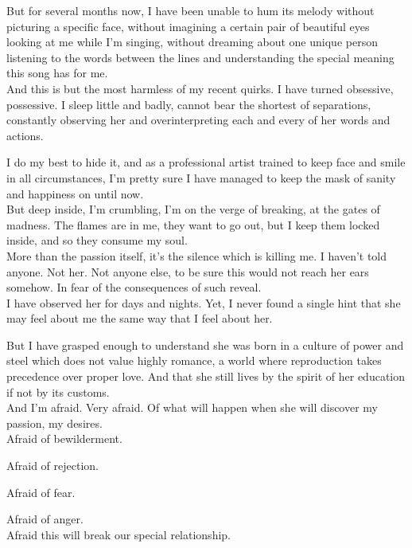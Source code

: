 \documentclass{report}
\begin{document}
But for several months now, I have been unable to hum its melody without picturing a specific face, without imagining a certain pair of beautiful eyes looking at me while I'm singing, without dreaming about one unique person listening to the words between the lines and understanding the special meaning this song has for me.\\

And this is but the most harmless of my recent quirks. I have turned obsessive, possessive. I sleep little and badly, cannot bear the shortest of separations, constantly observing her and overinterpreting each and every of her words and actions.

I do my best to hide it, and as a professional artist trained to keep face and smile in all circumstances, I'm pretty sure I have managed to keep the mask of sanity and happiness on until now.\\

But deep inside, I'm crumbling, I'm on the verge of breaking, at the gates of madness. The flames are in me, they want to go out, but I keep them locked inside, and so they consume my soul.\\

More than the passion itself, it's the silence which is killing me. I haven't told anyone. Not her. Not anyone else, to be sure this would not reach her ears somehow. In fear of the consequences of such reveal.\\

I have observed her for days and nights. Yet, I never found a single hint that she may feel about me the same way that I feel about her.

But I have grasped enough to understand she was born in a culture of power and steel which does not value highly romance, a world where reproduction takes precedence over proper love. And that she still lives by the spirit of her education if not by its customs.\\

And I'm afraid. Very afraid. Of what will happen when she will discover my passion, my desires.\\

Afraid of bewilderment.

Afraid of rejection.

Afraid of fear.

Afraid of anger.\\

Afraid this will break our special relationship.\\
\end{document}
